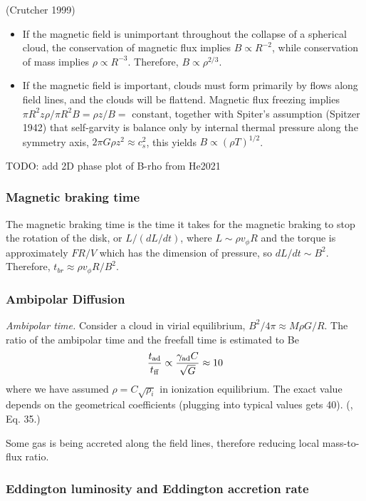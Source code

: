 (Crutcher 1999)
\begin{itemize}
\item If the magnetic field is unimportant throughout the collapse of a spherical cloud, the conservation of magnetic flux implies \(B \propto R^{-2}\), while conservation of mass implies \(\rho \propto R^{-3}\). Therefore, \(B \propto \rho^{2/3}\).
\item If the magnetic field is important, clouds must form primarily by flows along field lines, and the clouds will be flattend. Magnetic flux freezing implies \(\pi R^2 z \rho / \pi R^2 B = \rho z / B =\) constant, together with Spiter's assumption (Spitzer 1942) that self-garvity is balance only by internal thermal pressure along the symmetry axis, \(2\pi G \rho z^2 \approx c_s^2\), this yields \(B \propto (\rho T)^{1/2}\).
\end{itemize}

TODO: add 2D phase plot of B-rho from He2021

\subsubsection{Magnetic braking time}
The magnetic braking time is the time it takes for the magnetic braking to stop the rotation of the disk, or \(L/(dL/dt)\), where \(L \sim \rho v_\phi R\) and the torque is approximately \(F R / V\) which has the dimension of pressure, so \(dL/dt \sim B^2\). Therefore, \(t_{br} \approx \rho v_\phi R / B^2\).

\subsubsection{Ambipolar Diffusion}

{\it Ambipolar time.} Consider a  cloud in virial equilibrium, \(B^2/4\pi \approx M \rho G / R\). The ratio of the ambipolar time and the freefall time is estimated to Be
\[
    \frac{t_{\rm ad}}{t_{\rm ff}} \propto \frac{\gamma_{\rm ad}C}{\sqrt{G}} \approx 10  
\]
where we have assumed \(\rho = C\sqrt{\rho_i}\) in ionization equilibrium. The exact value depends on the geometrical coefficients (plugging into typical values gets 40). 
(\citealt{Hennebelle2019}, Eq. 35.)

Some gas is being accreted along the field lines, therefore reducing local mass-to-flux ratio. 

\subsubsection{Eddington luminosity and Eddington accretion rate}
\label{sec:eddington}

